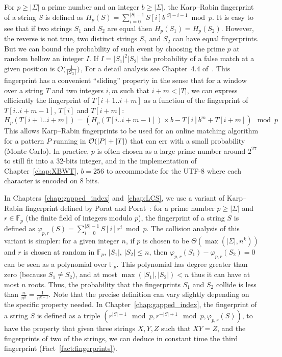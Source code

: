 For $p \geq |\Sigma|$ a prime number and an integer $b\geq |\Sigma|$, the Karp--Rabin fingerprint~\cite{DBLP:journals/ibmrd/KarpR87} of a string $S$ is defined as
$H_{p}(S) = \sum_{i = 0}^{|S|-1}  S[i]b^{|S|-i-1} \bmod p$.
It is easy to see that if two strings $S_1$ and $S_2$ are equal then $H_p(S_1) = H_p(S_2)$. However, the reverse is not true, two distinct strings $S_1$ and $S_2$ can have equal fingerprints.
%
But we can bound the probability of such event by choosing the prime $p$ at random bellow an integer $I$. If $I=|S_1|^2|S_2|$ the probability of a false match at a given position is $\mathcal{O}(\frac{1}{|S_1|})$, For a detail analysis see Chapter~4.4 of~\cite{Gusfield1997}.
This fingerprint has a convenient ``sliding'' property in the sense that for a window over a string $T$ and two integers $i,m$ such that $i+m < |T|$, we can express efficiently the fingerprint of $T[i+1..i+m]$ as a function of the fingerprint of $T[i..i+m-1]$, $T[i]$ and $T[i+m]$:
$$ H_{p}(T[i+1..i+m]) = ( H_{p}(T[i..i+m-1])\times b - T[i]b^{m} + T[i+m]  ) \mod p$$
This allows Karp--Rabin fingerprints to be used for an online matching algorithm for a pattern $P$ running in $\mathcal{O}(|P|+|T|)$ that can err with a small probability (Monte-Carlo).
In practice, $p$ is often chosen as a large prime number around $2^{27}$ to still fit into a 32-bits integer, and in the implementation of Chapter~\ref{chap:XBWT}, $b=256$ to accommodate for the UTF-8 where each character is encoded on 8 bits.

In Chapters~\ref{chap:gapped_index} and~\ref{chap:LCS}, we use a variant of Karp--Rabin fingerprint defined by Porat and Porat~\cite{Porat:09}: 
for a prime number $p\geq |\Sigma|$  and $r \in \mathbb{F}_p$ (the finite field of integers modulo $p$), the fingerprint of a string $S$ is defined as
$\varphi_{p,r}(S) = \sum_{i = 0}^{|S|-1}  S[i]r^{i} \bmod p$.
The collision analysis of this variant is simpler: %
for a given integer $n$, if $p$ is chosen to be $\Theta(\max(|\Sigma|,n^k))$ and $r$ is chosen at random in $\mathbb{F}_p$, $|S_1|$, $|S_2|\leq n$, then $\varphi_{p,r}(S_1) - \varphi_{p,r}(S_2) = 0$ can be seen as a polynomial over $\mathbb{F}_p$. This polynomial has degree greater than zero (because $S_1 \neq S_2$), and at most $\max(|S_1|,|S_2|) < n$ thus it can have at most $n$ roots. Thus, the probability that the fingerprints $S_1$ and $S_2$ collide is less than $\frac{n}{n^k} = \frac{1}{n^{k-1}}$.
Note that the precise definition can vary slightly depending on the specific property needed. In Chapter~\ref{chap:gapped_index}, the fingerprint of a string $S$ is defined as a triple $(r^{|S|-1} \mod p, r^{-|S|+1} \mod p, \varphi_{p,r}(S))$, to have the property that given three strings $X,Y,Z$ such that $XY =Z$, and the fingerprints of two of the strings, we can deduce in constant time the third fingerprint (Fact~\ref{fact:fingerprints}). 


